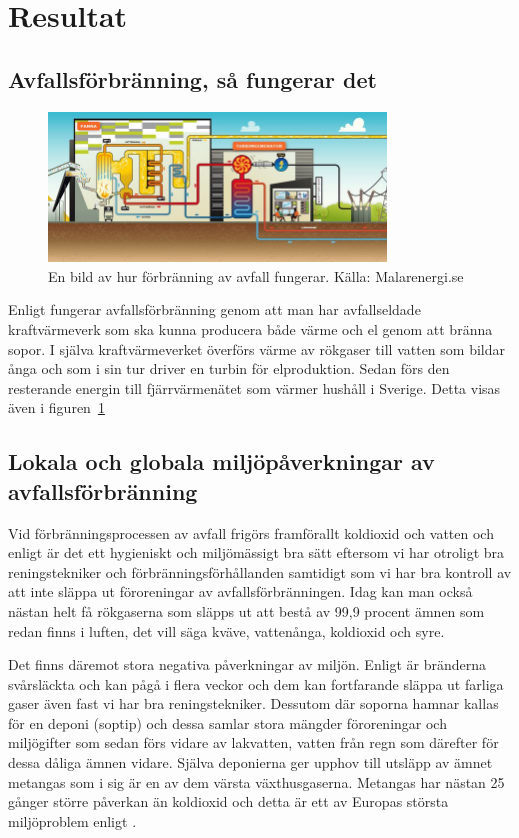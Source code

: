 \documentclass[11p]{article}
\begin{document}
    \section{Resultat}
    \subsection{Avfallsförbränning, så fungerar det}
    \begin{figure}[!h]
        \includegraphics[width=0.8\textwidth]{../images/avfallförbränning.jpg}
        \caption{En bild av hur förbränning av avfall fungerar. Källa: Malarenergi.se}
        \label{fig:avfallsforbranning}
    \end{figure}
    Enligt \textcite{SoporNu} fungerar avfallsförbränning genom att man har avfallseldade kraftvärmeverk som ska kunna producera både värme och el genom att bränna sopor.
    I själva kraftvärmeverket överförs värme av rökgaser till vatten som bildar ånga och som i sin tur driver en turbin för elproduktion.
    Sedan förs den resterande energin till fjärrvärmenätet som värmer hushåll i Sverige.
    Detta visas även i figuren~\ref{fig:avfallsforbranning}
    \subsection{Lokala och globala miljöpåverkningar av avfallsförbränning}
    Vid förbränningsprocessen av avfall frigörs framförallt koldioxid och vatten och enligt \textcite{AvfallSverige} är det ett hygieniskt och miljömässigt bra sätt eftersom vi har otroligt bra reningstekniker och förbränningsförhållanden samtidigt som vi har bra kontroll av att inte släppa ut föroreningar av avfallsförbränningen.
    Idag kan man också nästan helt få rökgaserna som släpps ut att bestå av 99,9 procent ämnen som redan finns i luften, det vill säga kväve, vattenånga, koldioxid och syre.

    \newline

    Det finns däremot stora negativa påverkningar av miljön. Enligt \textcite{naturvardsverket} är bränderna svårsläckta och kan pågå i flera veckor och dem kan fortfarande släppa ut farliga gaser även fast vi har bra reningstekniker. Dessutom där soporna hamnar kallas för en deponi (soptip) och dessa samlar stora mängder föroreningar och miljögifter som sedan förs vidare av lakvatten, vatten från regn som därefter för dessa dåliga ämnen vidare. Själva deponierna ger upphov till utsläpp av ämnet metangas som i sig är en av dem värsta växthusgaserna. Metangas har nästan 25 gånger större påverkan än koldioxid och detta är ett av Europas största miljöproblem enligt \textcite{Vattenfall}.
\end{document}

